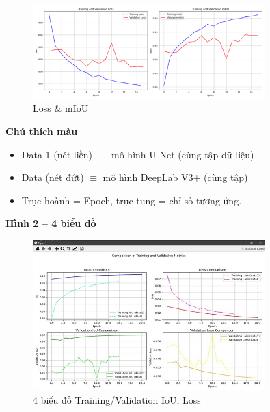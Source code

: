 \documentclass[12pt]{report}
\begin{document}
\begin{figure}[h]
    \centering
    \includegraphics[width=0.8\textwidth]{loss_miou.png}
    \caption{Loss \& mIoU}
\end{figure}

\vspace{0.5cm}

\textbf{Chú thích màu}
\begin{itemize}
    \item Data 1 (nét liền)  $\equiv$ mô hình U Net (cùng tập dữ liệu)
    \item Data (nét đứt) $\equiv$ mô hình DeepLab V3+ (cùng tập)
    \item Trục hoành = Epoch, trục tung = chỉ số tương ứng.
\end{itemize}

\textbf{Hình 2 – 4 biểu đồ}
\begin{figure}[h]
    \centering
    \includegraphics[width=0.8\textwidth]{4_bieudo.jpg}
    \caption{4 biểu đồ Training/Validation IoU, Loss}
\end{figure}
\end{document}
